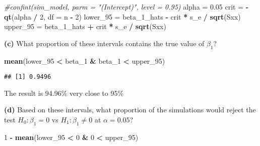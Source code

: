 \documentclass[
]{article}
\newenvironment{Shaded}{\begin{snugshade}}{\end{snugshade}}
\newcommand{\CommentTok}[1]{\textcolor[rgb]{0.56,0.35,0.01}{\textit{#1}}}
\newcommand{\DataTypeTok}[1]{\textcolor[rgb]{0.13,0.29,0.53}{#1}}
\newcommand{\DecValTok}[1]{\textcolor[rgb]{0.00,0.00,0.81}{#1}}
\newcommand{\FloatTok}[1]{\textcolor[rgb]{0.00,0.00,0.81}{#1}}
\newcommand{\KeywordTok}[1]{\textcolor[rgb]{0.13,0.29,0.53}{\textbf{#1}}}
\newcommand{\NormalTok}[1]{#1}
\newcommand{\OperatorTok}[1]{\textcolor[rgb]{0.81,0.36,0.00}{\textbf{#1}}}
\newcommand{\StringTok}[1]{\textcolor[rgb]{0.31,0.60,0.02}{#1}}
\begin{document}
\begin{Shaded}
\begin{Highlighting}[]
\CommentTok{#confint(sim_model, parm = "(Intercept)", level = 0.95)}
\NormalTok{alpha =}\StringTok{ }\FloatTok{0.05}
\NormalTok{crit =}\StringTok{ }\OperatorTok{-}\KeywordTok{qt}\NormalTok{(alpha }\OperatorTok{/}\StringTok{ }\DecValTok{2}\NormalTok{, }\DataTypeTok{df =}\NormalTok{ n }\OperatorTok{-}\StringTok{ }\DecValTok{2}\NormalTok{)}
\NormalTok{lower_}\DecValTok{95}\NormalTok{ =}\StringTok{ }\NormalTok{beta_}\DecValTok{1}\NormalTok{_hats }\OperatorTok{-}\StringTok{ }\NormalTok{crit }\OperatorTok{*}\StringTok{ }\NormalTok{s_e }\OperatorTok{/}\StringTok{ }\KeywordTok{sqrt}\NormalTok{(Sxx)}
\NormalTok{upper_}\DecValTok{95}\NormalTok{ =}\StringTok{ }\NormalTok{beta_}\DecValTok{1}\NormalTok{_hats }\OperatorTok{+}\StringTok{ }\NormalTok{crit }\OperatorTok{*}\StringTok{ }\NormalTok{s_e }\OperatorTok{/}\StringTok{ }\KeywordTok{sqrt}\NormalTok{(Sxx)}
\end{Highlighting}
\end{Shaded}

\textbf{(c)} What proportion of these intervals contains the true value
of \(\beta_1\)?

\begin{Shaded}
\begin{Highlighting}[]
\KeywordTok{mean}\NormalTok{(lower_}\DecValTok{95} \OperatorTok{<}\StringTok{ }\NormalTok{beta_}\DecValTok{1} \OperatorTok{&}\StringTok{ }\NormalTok{beta_}\DecValTok{1} \OperatorTok{<}\StringTok{ }\NormalTok{upper_}\DecValTok{95}\NormalTok{)}
\end{Highlighting}
\end{Shaded}

\begin{verbatim}
## [1] 0.9496
\end{verbatim}

The result is 94.96\% very close to 95\%

\textbf{(d)} Based on these intervals, what proportion of the
simulations would reject the test \(H_0: \beta_1 = 0\) vs
\(H_1: \beta_1 \neq 0\) at \(\alpha = 0.05\)?

\begin{Shaded}
\begin{Highlighting}[]
\DecValTok{1} \OperatorTok{-}\StringTok{ }\KeywordTok{mean}\NormalTok{(lower_}\DecValTok{95} \OperatorTok{<}\StringTok{ }\DecValTok{0} \OperatorTok{&}\StringTok{ }\DecValTok{0} \OperatorTok{<}\StringTok{ }\NormalTok{upper_}\DecValTok{95}\NormalTok{)}
\end{Highlighting}
\end{Shaded}
\end{document}
